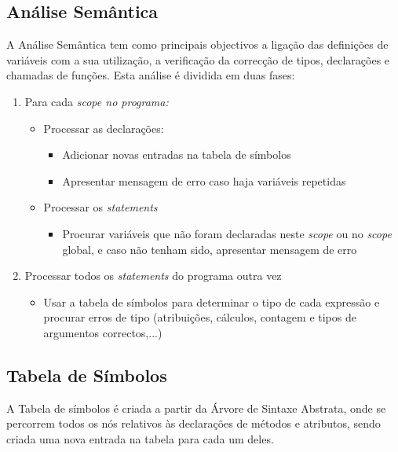 \documentclass[12pt]{article}
\begin{document}
\subsection{Análise Semântica}
A Análise Semântica tem como principais objectivos a ligação das definições de variáveis com a sua utilização, a verificação da correcção de tipos, declarações e chamadas de funções.
Esta análise é dividida em duas fases:
\begin{enumerate}
	\item Para cada \emph{scope no programa:}
	\begin{itemize}
		\item Processar as declarações:
		\begin{itemize}
			\item Adicionar novas entradas na tabela de símbolos
			\item Apresentar mensagem de erro caso haja variáveis repetidas
		\end{itemize}
		\item Processar os \emph{statements}
		\begin{itemize}
			\item Procurar variáveis que não foram declaradas neste \emph{scope} ou no \emph{scope} global, e caso não tenham sido, apresentar mensagem de erro
		\end{itemize}
	\end{itemize}
	\item Processar todos os \emph{statements} do programa outra vez
	\begin{itemize}
		\item Usar a tabela de símbolos para determinar o tipo de cada expressão e procurar erros de tipo (atribuições, cálculos, contagem e tipos de argumentos correctos,...)
	\end{itemize}
\end{enumerate}

\subsection{Tabela de Símbolos}

A Tabela de símbolos é criada a partir da Árvore de Sintaxe Abstrata, onde se percorrem todos os nós relativos às declarações de métodos e atributos, sendo criada uma nova entrada na tabela para cada um deles. 
\end{document}
